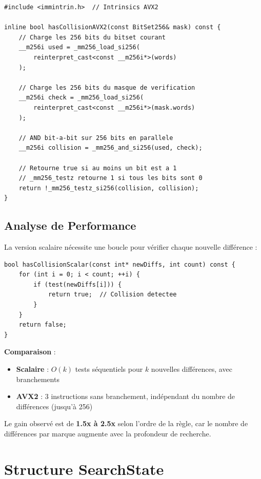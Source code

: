 \documentclass[12pt,a4paper,twoside]{report}
\begin{document}
\begin{lstlisting}[caption={Détection de collision AVX2 dans BitSet256}]
#include <immintrin.h>  // Intrinsics AVX2

inline bool hasCollisionAVX2(const BitSet256& mask) const {
    // Charge les 256 bits du bitset courant
    __m256i used = _mm256_load_si256(
        reinterpret_cast<const __m256i*>(words)
    );

    // Charge les 256 bits du masque de verification
    __m256i check = _mm256_load_si256(
        reinterpret_cast<const __m256i*>(mask.words)
    );

    // AND bit-a-bit sur 256 bits en parallele
    __m256i collision = _mm256_and_si256(used, check);

    // Retourne true si au moins un bit est a 1
    // _mm256_testz retourne 1 si tous les bits sont 0
    return !_mm256_testz_si256(collision, collision);
}
\end{lstlisting}

\subsection{Analyse de Performance}

La version scalaire nécessite une boucle pour vérifier chaque nouvelle différence :

\begin{lstlisting}[caption={Version scalaire (avant optimisation)}]
bool hasCollisionScalar(const int* newDiffs, int count) const {
    for (int i = 0; i < count; ++i) {
        if (test(newDiffs[i])) {
            return true;  // Collision detectee
        }
    }
    return false;
}
\end{lstlisting}

\textbf{Comparaison} :
\begin{itemize}
    \item \textbf{Scalaire} : $O(k)$ tests séquentiels pour $k$ nouvelles différences, avec branchements
    \item \textbf{AVX2} : 3 instructions sans branchement, indépendant du nombre de différences (jusqu'à 256)
\end{itemize}

Le gain observé est de \textbf{1.5x à 2.5x} selon l'ordre de la règle, car le nombre de différences par marque augmente avec la profondeur de recherche.

\section{Structure SearchState}
\end{document}

